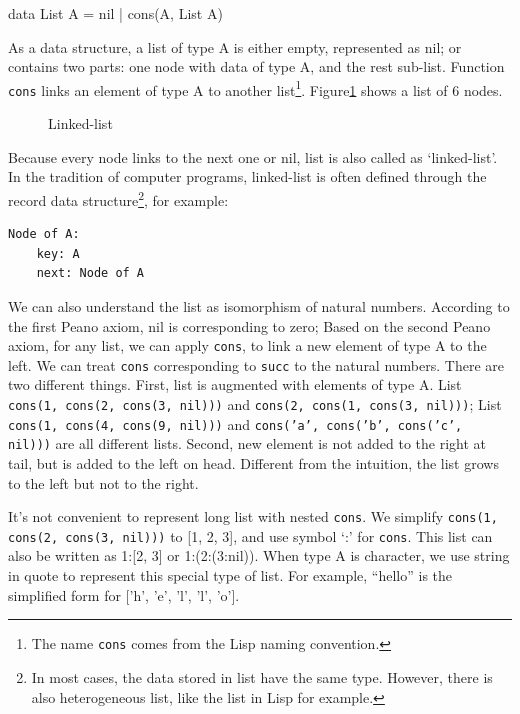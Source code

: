 \documentclass[b5paper]{article}
\begin{document}
\begin{Haskell}
data List A = nil | cons(A, List A)
\end{Haskell}

As a data structure, a list of type A is either empty, represented as nil; or contains two parts: one node with data of type A, and the rest sub-list. Function \texttt{cons} links an element of type A to another list\footnote{The name \texttt{cons} comes from the Lisp naming convention.}. Figure\ref{fig:linked-list} shows a list of 6 nodes.

\begin{figure}[htbp]
\centering
{}
\caption{Linked-list}
\label{fig:linked-list}
\end{figure}

Because every node links to the next one or nil, list is also called as `linked-list'. In the tradition of computer programs, linked-list is often defined through the record data structure\footnote{In most cases, the data stored in list have the same type. However, there is also heterogeneous list, like the list in Lisp for example.}, for example:

\begin{lstlisting}
Node of A:
    key: A
    next: Node of A
\end{lstlisting}

We can also understand the list as isomorphism of natural numbers. According to the first Peano axiom, nil is corresponding to zero; Based on the second Peano axiom, for any list, we can apply \texttt{cons}, to link a new element of type A to the left. We can treat \texttt{cons} corresponding to \texttt{succ} to the natural numbers. There are two different things. First, list is augmented with elements of type A. List \texttt{cons(1, cons(2, cons(3, nil)))} and \texttt{cons(2, cons(1, cons(3, nil)))}; List \texttt{cons(1, cons(4, cons(9, nil)))} and \texttt{cons('a', cons('b', cons('c', nil)))} are all different lists. Second, new element is not added to the right at tail, but is added to the left on head. Different from the intuition, the list grows to the left but not to the right.

It's not convenient to represent long list with nested \texttt{cons}. We simplify \texttt{cons(1, cons(2, cons(3, nil)))} to [1, 2, 3], and use symbol `:' for \texttt{cons}. This list can also be written as 1:[2, 3] or 1:(2:(3:nil)). When type A is character, we use string in quote to represent this special type of list. For example, ``hello'' is the simplified form for ['h', 'e', 'l', 'l', 'o'].
\end{document}
